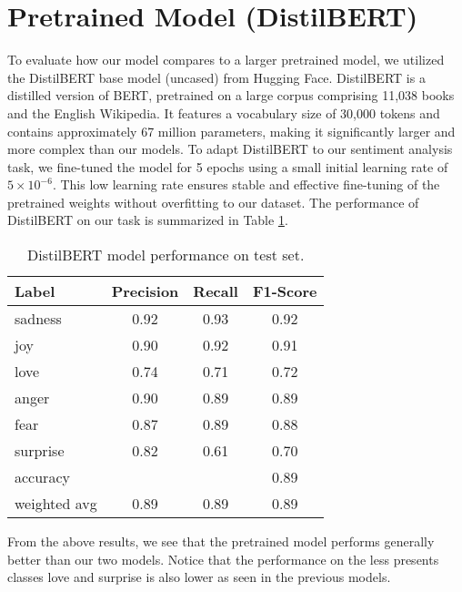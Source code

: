 \section{Pretrained Model (DistilBERT)}
To evaluate how our model compares to a larger pretrained model, we utilized the DistilBERT base model (uncased) from Hugging Face. DistilBERT is a distilled version of BERT, pretrained on a large corpus comprising 11,038 books and the English Wikipedia. It features a vocabulary size of 30,000 tokens and contains approximately 67 million parameters, making it significantly larger and more complex than our models. To adapt DistilBERT to our sentiment analysis task, we fine-tuned the model for 5 epochs using a small initial learning rate of $5\times10^{-6}$. This low learning rate ensures stable and effective fine-tuning of the pretrained weights without overfitting to our dataset. The performance of DistilBERT on our task is summarized in Table \ref{tab:distilbert_model}.

\begin{table}[H]
    \vspace*{-0.5cm}
    \centering
    \begin{tabular}{|l|c|c|c|}
        \hline
        Label        & Precision & Recall & F1-Score \\ \hline
        sadness      & 0.92      & 0.93   & 0.92     \\ \hline
        joy          & 0.90      & 0.92   & 0.91     \\ \hline
        love         & 0.74      & 0.71   & 0.72     \\ \hline
        anger        & 0.90      & 0.89   & 0.89     \\ \hline
        fear         & 0.87      & 0.89   & 0.88     \\ \hline
        surprise     & 0.82      & 0.61   & 0.70     \\ \hline\hline
        accuracy     &           &        & 0.89     \\ \hline
        weighted avg & 0.89      & 0.89   & 0.89     \\ \hline
    \end{tabular}
    \caption{DistilBERT model performance on test set.}
    \label{tab:distilbert_model}
    \vspace*{-0.8cm}
\end{table}

From the above results, we see that the pretrained model performs generally better than our two models. Notice that the performance on the less presents classes love and surprise is also lower as seen in the previous models.